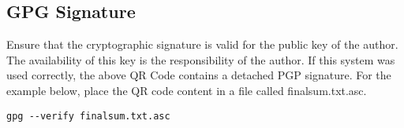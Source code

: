 \documentclass[a4paper,12pt]{texMemo}
\begin{document}
\subsection{GPG Signature}
Ensure that the cryptographic signature is valid for the public key of the author. The availability of this key is the responsibility of the author. If this system was used correctly, the above QR Code contains a detached PGP signature. For the example below, place the QR code content in a file called finalsum.txt.asc.
\begin{lstlisting}
gpg --verify finalsum.txt.asc
\end{lstlisting}
\end{document}

